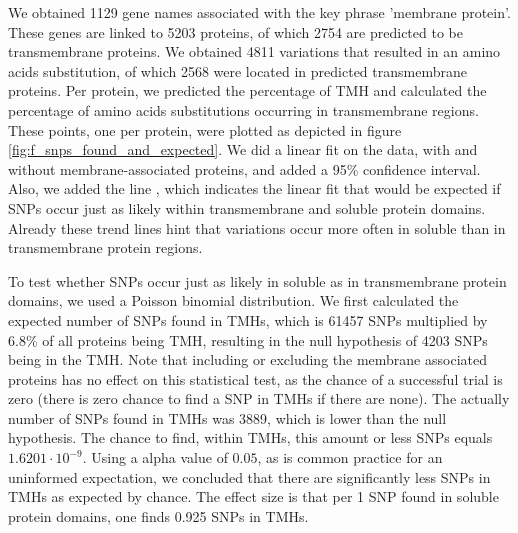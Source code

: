 We obtained 1129 gene names associated with the key phrase 'membrane protein'.
These genes are linked to 5203 proteins, of which 2754
are predicted to be transmembrane proteins.
We obtained 4811 variations that resulted in an
amino acids substitution, of which 2568 were located 
in predicted transmembrane proteins.
Per protein, we predicted the percentage of TMH
and calculated the percentage of amino acids substitutions
occurring in transmembrane regions.
These points, one per protein, were plotted as depicted in figure
\ref{fig:f_snps_found_and_expected}.
We did a linear fit on the data, with and without
membrane-associated proteins, and added a 95\%
confidence interval.
Also, we added the line ,
which indicates the linear fit that would be expected if
SNPs occur just as likely within transmembrane and soluble
protein domains. Already these trend lines
hint that variations occur more often in soluble 
than in transmembrane protein regions.

To test whether SNPs occur just as likely in soluble as
in transmembrane protein domains, we used a Poisson binomial
distribution. We first calculated the expected number of SNPs
found in TMHs, which is 61457 SNPs multiplied by 6.8\% 
of all proteins being TMH, resulting in the null hypothesis
of 4203 SNPs being in the TMH. 
Note that including or excluding
the membrane associated proteins 
has no effect on this statistical test, as the chance 
of a successful trial is zero (there is zero chance
to find a SNP in TMHs if there are none).
The actually number of SNPs found in TMHs
was 3889, which is lower than the null hypothesis. 
The chance to find, within TMHs, this amount or less SNPs 
equals $1.6201 \cdot 10^{-9}$.
Using a alpha value of $0.05$, as is common practice for an uninformed
expectation, we concluded that there are significantly less SNPs
in TMHs as expected by chance.
The effect size is that per 1 SNP found in soluble protein
domains, one finds 0.925 SNPs in TMHs.

